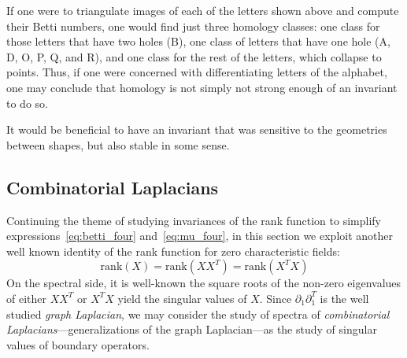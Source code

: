 \documentclass[10pt]{article}
\numberwithin{equation}{section}
\newcommand{\+}{%
	\raisebox{0.18ex}{\scaleobj{0.55}{+}}
}
\theoremstyle{definition}
\theoremstyle{definition}
\begin{document}
\noindent If one were to triangulate images of each of the letters shown above and compute their Betti numbers, one would find just three homology classes: one class for those letters that have two holes (B), one class of letters that have one hole (A, D, O, P, Q, and R), and one class for the rest of the letters, which collapse to points. Thus, if one were concerned with differentiating letters of the alphabet, one may conclude that homology is not simply not strong enough of an invariant to do so. 

It would be beneficial to have an invariant that was sensitive to the geometries between shapes, but also stable in some sense.
\newpage

\subsection{Combinatorial Laplacians}\label{sec:laplacian_theory}
Continuing the theme of studying invariances of the rank function to simplify expressions~\eqref{eq:betti_four} and~\eqref{eq:mu_four}, in this section we exploit another well known identity of the rank function for zero characteristic fields: 
$$\mathrm{rank}(X) = \mathrm{rank}(X X^T) = \mathrm{rank}(X^T X)$$ 
On the spectral side, it is well-known the square roots of the non-zero eigenvalues of either $XX^T$ or $X^T X$ yield the singular values of $X$. Since $\partial_1 \partial_1^T$ is the well studied \emph{graph Laplacian}, we may consider the study of spectra of \emph{combinatorial Laplacians}---generalizations of the graph Laplacian---as the study of singular values of boundary operators.  
\end{document}
